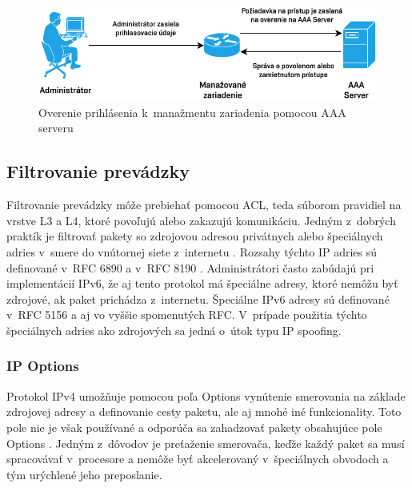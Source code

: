 \begin{figure}[H]
	\begin{center}
		\includegraphics[scale=1.1]{obrazky/AAA.pdf}
	\end{center}
	\caption[Overenie prihlásenia k~manažmentu zariadenia pomocou AAA serveru]{Overenie prihlásenia k~manažmentu zariadenia pomocou AAA serveru}
	\label{fig:aaa-mngmt}
\end{figure} 



\subsection{Filtrovanie prevádzky}
Filtrovanie prevádzky môže prebiehať pomocou ACL, teda súborom pravidiel na vrstve L3 a L4, ktoré povoľujú alebo zakazujú komunikáciu. Jedným z~dobrých praktík je filtrovať pakety so zdrojovou adresou privátnych alebo špeciálnych adries v~smere do vnútornej siete z~internetu \cite{Jackson2010}. Rozsahy týchto IP adries sú definované v~RFC 6890 \cite{rfc6890al6BqxiLuoAdpLeG} a v~RFC 8190 \cite{rfc8190O1cp1uhrCiYj0LYK}. Administrátori často zabúdajú pri implementácií IPv6, že aj tento protokol má špeciálne adresy, ktoré nemôžu byť zdrojové, ak paket prichádza z~internetu. Špeciálne IPv6 adresy sú definované v~RFC 5156 \cite{rfc5156lPYdBFaqWC5RwyJI} a aj vo vyššie spomenutých RFC. V~prípade použitia týchto špeciálnych adries ako zdrojových sa jedná o~útok typu IP spoofing.

\subsubsection{IP Options}
Protokol IPv4 umožňuje pomocou poľa Options vynútenie smerovania na základe zdrojovej adresy a definovanie cesty paketu, ale aj mnohé iné funkcionality. Toto pole nie je však používané a odporúča sa zahadzovať pakety obsahujúce pole Options \cite{Singh2018}. Jedným z~dôvodov je preťaženie smerovača, keďže každý paket sa musí spracovávať v~procesore a nemôže byť akcelerovaný v~špeciálnych obvodoch a tým urýchlené jeho preposlanie. 

